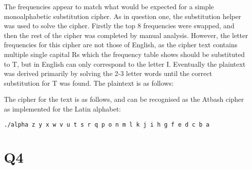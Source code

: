 \documentclass[pdflatex, a4paper,12pt]{article}
\begin{document}
The frequencies appear to match what would be expected for a simple
monoalphabetic substitution cipher. As in question one, the substitution helper
was used to solve the cipher.
Firstly the top 8 frequencies were swapped, and then the rest of the cipher was
completed by manual analysis. However, the letter frequencies for this cipher
are not those of English, as the cipher text contains multiple single capital
Rs which the frequency table shows should be substituted to T, but in English
can only correspond to the letter I. Eventually the plaintext was derived
primarily by solving the 2-3 letter words until the correct substitution for T
was found. The plaintext is as follows:

\begin{quote}
    
\end{quote}    

The cipher for the text is as follows, and can be recognised as the Atbash
cipher as implemented for the Latin alphabet:

\begin{verbatim}
./alpha z y x w v u t s r q p o n m l k j i h g f e d c b a
\end{verbatim}

\section{Q4}
\end{document}
